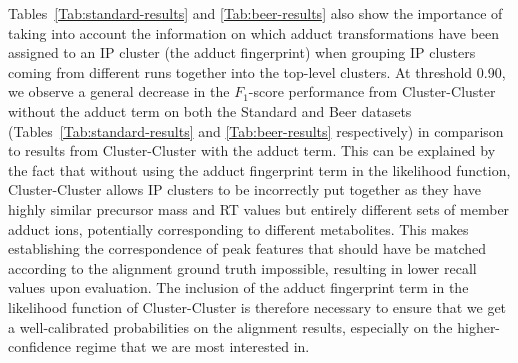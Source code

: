 Tables~\ref{Tab:standard-results} and \ref{Tab:beer-results} also show the importance of taking into account the information on which adduct transformations have been assigned to an IP cluster (the adduct fingerprint) when grouping IP clusters coming from different runs together into the top-level clusters. At threshold 0.90, we observe a general decrease in the $F_1$-score performance from Cluster-Cluster without the adduct term on both the Standard and Beer datasets (Tables~\ref{Tab:standard-results} and \ref{Tab:beer-results} respectively) in comparison to results from Cluster-Cluster with the adduct term. This can be explained by the fact that without using the adduct fingerprint term in the likelihood function, Cluster-Cluster allows IP clusters to be incorrectly put together as they have highly similar precursor mass and RT values but entirely different sets of member adduct ions, potentially corresponding to different metabolites. This makes establishing the correspondence of peak features that should have be matched according to the alignment ground truth impossible, resulting in lower recall values upon evaluation. The inclusion of the adduct fingerprint term in the likelihood function of Cluster-Cluster is therefore necessary to ensure that we get a well-calibrated probabilities on the alignment results, especially on the higher-confidence regime that we are most interested in.

